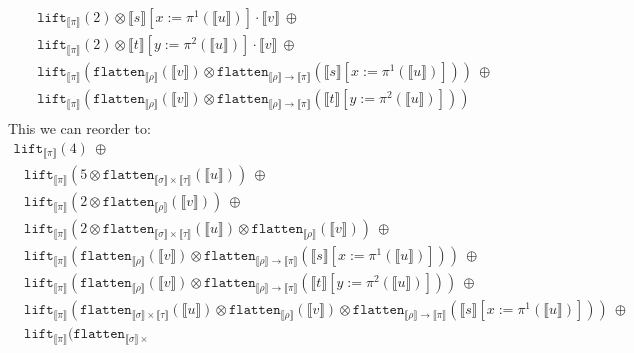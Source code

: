 \documentclass[runningheads,a4paper]{llncs}
\newcommand{\typeinterpret}[1]{\llbracket #1 \rrbracket}
\newcommand{\interpret}[1]{\llbracket #1 \rrbracket}
\newcommand{\arrtype}{\rightarrow}
\newcommand{\flatten}{\mathtt{flatten}}
\newcommand{\lift}{\mathtt{lift}}
\begin{document}
\begin{itemize}
\[\begin{array}{l}
  \phantom{A}
  \lift_{\typeinterpret{\pi}}(2) \otimes \interpret{s}[x:=\pi^1(
    \interpret{u})] \cdot \interpret{v}\ \oplus \\
  \phantom{A}
  \lift_{\typeinterpret{\pi}}(2) \otimes \interpret{t}[y:=\pi^2(
    \interpret{u})] \cdot \interpret{v}\ \oplus \\
  \phantom{A}
  \lift_{\typeinterpret{\pi}}(
    \flatten_{\typeinterpret{\rho}}(\interpret{v}) \otimes
    \flatten_{\typeinterpret{\rho} \arrtype \typeinterpret{\pi}}(
    \interpret{s}[x:=\pi^1(\interpret{u})]))\ \oplus \\
  \phantom{A}
  \lift_{\typeinterpret{\pi}}(
    \flatten_{\typeinterpret{\rho}}(\interpret{v}) \otimes
    \flatten_{\typeinterpret{\rho} \arrtype
    \typeinterpret{\pi}}(\interpret{t}[y:=\pi^2(\interpret{u})])) \\
  \end{array}
  \]
  This we can reorder to:
  \[
  \begin{array}{l}
  \lift_{\typeinterpret{\pi}}(4)\ \oplus \\
  \phantom{A}
  \lift_{\typeinterpret{\pi}}(5 \otimes \flatten_{\typeinterpret{\sigma}
    \times \typeinterpret{\tau}}(\interpret{u}))\ \oplus \\
  \phantom{A}
  \lift_{\typeinterpret{\pi}}(2 \otimes \flatten_{
    \typeinterpret{\rho}}(\interpret{v}))\ \oplus \\
  \phantom{A}
  \lift_{\typeinterpret{\pi}}(2 \otimes
    \flatten_{\typeinterpret{\sigma} \times
    \typeinterpret{\tau}}(\interpret{u}) \otimes
    \flatten_{\typeinterpret{\rho}}(\interpret{v}))\ \oplus \\
  \phantom{A}
  \lift_{\typeinterpret{\pi}}(
    \flatten_{\typeinterpret{\rho}}(\interpret{v}) \otimes
    \flatten_{\typeinterpret{\rho} \arrtype \typeinterpret{\pi}}(
    \interpret{s}[x:=\pi^1(\interpret{u})]))\ \oplus \\
  \phantom{A}
  \lift_{\typeinterpret{\pi}}(
    \flatten_{\typeinterpret{\rho}}(\interpret{v}) \otimes
    \flatten_{\typeinterpret{\rho} \arrtype
    \typeinterpret{\pi}}(\interpret{t}[y:=\pi^2(\interpret{u})]))\ 
    \oplus \\
  \phantom{A}
  \lift_{\typeinterpret{\pi}}(\flatten_{\typeinterpret{\sigma} \times
    \typeinterpret{\tau}}(\interpret{u}) \otimes
    \flatten_{\typeinterpret{\rho}}(\interpret{v}) \otimes
    \flatten_{\typeinterpret{\rho} \arrtype \typeinterpret{\pi}}(
    \interpret{s}[x:=\pi^1(\interpret{u})]))\ \oplus \\
  \phantom{A}
  \lift_{\typeinterpret{\pi}}(\flatten_{\typeinterpret{\sigma} \times
}
\end{array}\]
\end{itemize}
\end{document}
